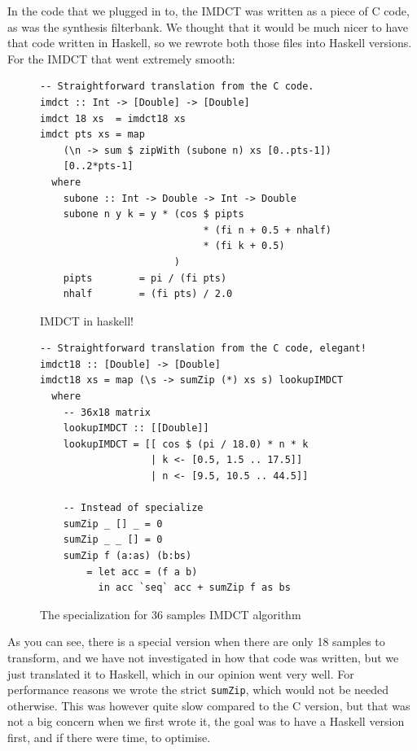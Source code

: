 \documentclass[a4paper,12pt]{article}
\begin{document}
        In the code that we plugged in to, the IMDCT was written as a piece of C
        code, as was the synthesis filterbank. We thought that it would be much
        nicer to have that code written in Haskell, so we rewrote both those
        files into Haskell versions. For the IMDCT that went extremely
        smooth:
\begin{figure}[h]
  \begin{center}
        \begin{lstlisting}
-- Straightforward translation from the C code.
imdct :: Int -> [Double] -> [Double]
imdct 18 xs  = imdct18 xs
imdct pts xs = map
    (\n -> sum $ zipWith (subone n) xs [0..pts-1])
    [0..2*pts-1]
  where
    subone :: Int -> Double -> Int -> Double
    subone n y k = y * (cos $ pipts
                            * (fi n + 0.5 + nhalf)
                            * (fi k + 0.5)
                       )
    pipts        = pi / (fi pts)
    nhalf        = (fi pts) / 2.0
        \end{lstlisting}
    \caption{IMDCT in haskell!}\label{fig:imdcthaskell}
  \end{center}
\end{figure}

\begin{figure}[h]
  \begin{center}
        \begin{lstlisting}
-- Straightforward translation from the C code, elegant!
imdct18 :: [Double] -> [Double]
imdct18 xs = map (\s -> sumZip (*) xs s) lookupIMDCT
  where
    -- 36x18 matrix
    lookupIMDCT :: [[Double]]
    lookupIMDCT = [[ cos $ (pi / 18.0) * n * k
                   | k <- [0.5, 1.5 .. 17.5]]
                   | n <- [9.5, 10.5 .. 44.5]]

    -- Instead of specialize
    sumZip _ [] _ = 0
    sumZip _ _ [] = 0
    sumZip f (a:as) (b:bs)
        = let acc = (f a b)
          in acc `seq` acc + sumZip f as bs
        \end{lstlisting}
    \caption{The specialization for 36 samples IMDCT algorithm}\label{fig:imdctimpl36}
  \end{center}
\end{figure}

        As you can see, there is a special version when there are only 18
        samples to transform, and we have not investigated in how that code was
        written, but we just translated it to Haskell, which in our opinion went
        very well. For performance reasons we wrote the strict \texttt{sumZip}, which would
        not be needed otherwise. This was however quite slow compared to the C
        version, but that was not a big concern when we first wrote it, the goal
        was to have a Haskell version first, and if there were time, to
        optimise. \\
\end{document}
